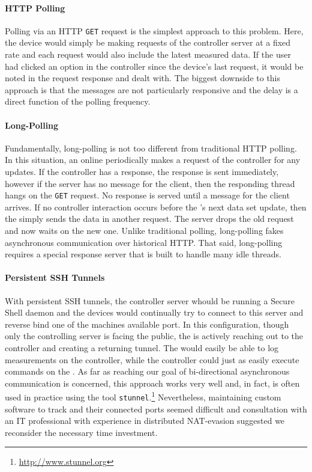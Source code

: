 \paragraph{HTTP Polling} Polling via an HTTP \texttt{GET} request is the simplest approach to this problem.  Here, the \netlet device would simply be making requests of the controller server at a fixed rate and each request would also include the latest measured data.  If the user had clicked an option in the controller since the device's last request, it would be noted in the request response and dealt with.  The biggest downside to this approach is that the messages are not particularly responsive and the delay is a direct function of the polling frequency.

\paragraph{Long-Polling} Fundamentally, long-polling is not too different from traditional HTTP polling.  In this situation, an online \netlet periodically makes a request of the controller for any updates.  If the controller has a response, the response is sent immediately, however if the server has no message for the client, then the responding thread hangs on the \texttt{GET} request.  No response is served until a message for the client arrives.  If no controller interaction occurs before the \netlet's next data set update, then the \netlet simply sends the data in another request.  The server drops the old request and now waits on the new one.  Unlike traditional polling, long-polling fakes asynchronous communication over historical HTTP. That said, long-polling requires a special response server that is built to handle many idle threads. \cite{longpoll}

\paragraph{Persistent SSH Tunnels} With persistent SSH tunnels, the controller server whould be running a Secure Shell daemon and the \netlet devices would continually try to connect to this server and reverse bind one of the machines available port.  In this configuration, though only the controlling server is facing the public, the \netlet is actively reaching out to the controller and creating a returning tunnel.  The \netlet would easily be able to log measurements on the controller, while the controller could just as easily execute commands on the \netlet.  As far as reaching our goal of bi-directional asynchronous communication is concerned, this approach works very well and, in fact, is often used in practice using the tool \texttt{stunnel}.\footnote{\url{http://www.stunnel.org}} Nevertheless, maintaining custom software to track \netlets and their connected ports seemed difficult and consultation with an IT professional with experience in distributed NAT-evasion suggested we reconsider the necessary time investment.

